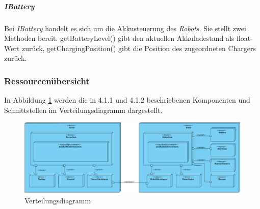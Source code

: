     	\subparagraph{IBattery}\label{ibattery}
    		Bei \emph{IBattery} handelt es sich um die Akkusteuerung des \emph{Robots}. Sie stellt zwei Methoden bereit. getBatteryLevel() gibt den aktuellen Akkuladestand als float-Wert zurück, getChargingPosition() gibt die Position des zugeordneten Chargers zurück.


\pagebreak
\subsubsection{Ressourcenübersicht}
    In Abbildung \ref{fig:4-1-3-verteilungsdiagramm} werden die in 4.1.1 und 4.1.2 beschriebenen
    Komponenten und Schnittstellen im Verteilungsdiagramm dargestellt.

    \begin{figure}[H]
      \centering
      \includegraphics[width=1.2\textwidth, angle=90]{img/2-Analyse-4-Produktumgebung}
      \caption{Verteilungsdiagramm}
      \label{fig:4-1-3-verteilungsdiagramm}
    \end{figure}
